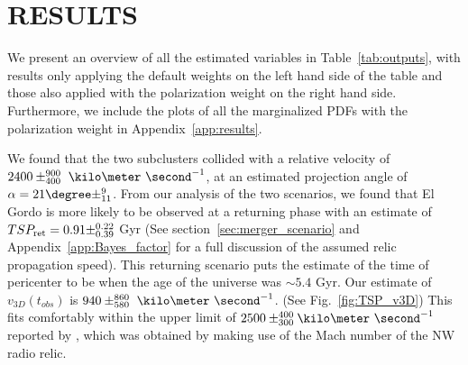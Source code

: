\documentclass[letterpaper,useAMS,usenatbib]{mn2e}
\begin{document}
\section{RESULTS} 
We present an
overview of all the estimated variables in Table~\ref{tab:outputs}, with
results only applying the default weights on the left hand side of the table
and those also applied with the polarization weight on the right hand side.
Furthermore, we include the plots of all the marginalized PDFs with the
polarization weight in Appendix~\ref{app:results}. \par
We found that the two subclusters collided with a relative velocity of $2400\pm^{900}_{400}~\kilo\meter~\second^{-1}$, at an estimated projection
angle of $\alpha = 21\degree\pm^{9}_{11}$. From our analysis of the two
scenarios, we found that El Gordo is more likely to be observed at a returning
phase with an estimate of $TSP_{\rm ret} = 0.91\pm^{0.22}_{0.39}$ Gyr
(See section~\ref{sec:merger_scenario} and Appendix~\ref{app:Bayes_factor}
for a full discussion of the assumed relic propagation speed). This
returning scenario puts the
estimate of the time of pericenter to be when the age of the universe was
$\sim5.4$ Gyr. 
Our estimate of $v_{3D}(t_{obs})$ is
$940\pm^{860}_{580}~\kilo\meter~\second^{-1}$. (See Fig.~\ref{fig:TSP_v3D})
This fits comfortably within the upper limit of $2500
\pm^{400}_{300}\kilo\meter~\second^{-1}$ reported by \cite{L13},
which was obtained by making use of the Mach number of the NW radio relic.
\end{document}
